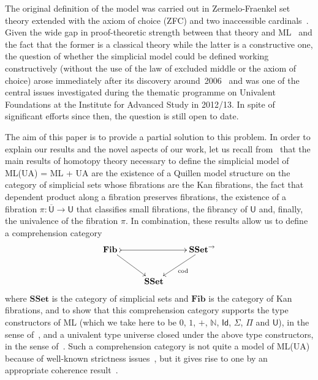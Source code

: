 \documentclass[reqno,10pt,a4paper,oneside,draft]{amsart}
\numberwithin{equation}{section}
\theoremstyle{mythm}
\theoremstyle{mydef}
\theoremstyle{myrmk}
\newcommand{\ie}{\text{i.e.\ }}
\newcommand{\co}{\colon}
\newcommand{\SSet}{\mathbf{SSet}}
\newcommand{\UU}{\overline{\mathsf{U}}}
\newcommand{\U}{\mathsf{U}}
\begin{document}
The original definition of the model  was carried out in  Zermelo-Fraenkel set theory extended with the axiom of choice (ZFC) and two inaccessible cardinals~\cite[Theorem~3.4.3]{voevodsky-simplicial-model}. Given the wide gap in proof-theoretic strength between that theory and ML~\cite{GrifforE:strsml} and the fact that the former is a classical theory  while the latter is a constructive one,  the question of whether the simplicial model could be defined working constructively (\ie without the use of the law of excluded middle or the axiom of choice) arose immediately after its discovery around~2006~\cite{KapulkinC:uniss,StreicherT:modtts,VoevodskyV:notts} and was one of the central issues investigated during the thematic programme on Univalent Foundations at the Institute for Advanced Study in 2012/13. In spite of  significant efforts since then, the question is still open to date.

The aim of this paper is to provide a partial solution to this problem.  In order to
explain our results and the novel aspects of our work, let us recall from~\cite{voevodsky-simplicial-model} that the main results of  homotopy theory necessary 
to define the simplicial model of ML(UA) = ML + UA are 
the existence of a Quillen
model structure on the category of simplicial sets whose fibrations are the Kan fibrations, 
 the fact that dependent product along a fibration preserves fibrations,
 the existence of a fibration $\pi \co \UU \to \U$ that classifies small fibrations, 
the fibrancy of $\U$ and, finally, the univalence of the fibration $\pi$. In combination, these results
allow us to define a comprehension category 
\[
\begin{gathered}
\xymatrix{
\mathbf{Fib}\,  \ar[dr] \ar@{>->}[rr] & & \SSet^{\to} \ar[dl]^{\mathrm{cod}} \\ 
 & \SSet &  }
 \end{gathered}
\]
where $\SSet$ is the category of simplicial sets 
and $\mathbf{Fib}$ is the category of Kan fibrations, 
and to show that this comprehension category supports the type
constructors of ML (which we take here to be $0$, $1$, $+$, $\mathbb{N}$, 
$\mathsf{Id}$, $\Sigma$, $\Pi$ and $\mathsf{U}$),
in the sense of~\cite{LumsdaineP:locuoc},  and a univalent type universe closed under the above type
constructors,  in the sense of~\cite{ShulmanM:allths}. Such a comprehension category is not quite a 
model of ML(UA) because of well-known strictness issues~\cite{HofmannM:intttl}, but it gives rise to one
by an appropriate coherence result~\cite{voevodsky-simplicial-model,LumsdaineP:locuoc}.
\end{document}
